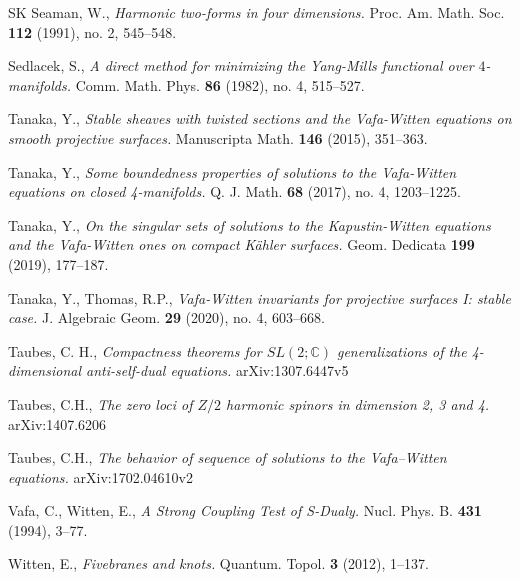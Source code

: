 \documentclass[12pt, twoside]{article}
\theoremstyle{definition}
\numberwithin{equation}{section}
\begin{document}
\begin{thebibliography}{SK}
Seaman, W.,
\textit{Harmonic two-forms in four dimensions.}
Proc. Am. Math. Soc. \textbf{112} (1991), no. 2, 545--548. 

Sedlacek, S.,
\textit{A direct method for minimizing the Yang-Mills functional over $4$-manifolds.}
 Comm. Math. Phys. \textbf{86} (1982), no. 4, 515--527. 

Tanaka, Y.,
\textit{Stable sheaves with twisted sections and the Vafa-Witten equations on smooth projective surfaces.}
{Manuscripta Math.} \textbf{146} (2015), 351--363.

Tanaka, Y.,
\textit{Some boundedness properties of solutions to the Vafa-Witten equations on closed 4-manifolds.}
Q. J. Math. \textbf{68} (2017), no. 4, 1203--1225. 

Tanaka, Y.,
\textit{On the singular sets of solutions to the Kapustin-Witten equations and the Vafa-Witten ones on compact Kähler surfaces.}
Geom. Dedicata \textbf{199} (2019), 177--187. 

Tanaka, Y., Thomas, R.P., 
\textit{Vafa-Witten invariants for projective surfaces I: stable case.}
J. Algebraic Geom. \textbf{29} (2020), no. 4, 603--668. 

Taubes, C. H.,
\textit{Compactness theorems for $SL(2;\mathbb{C})$ generalizations of the 4-dimensional anti-self-dual equations.} arXiv:1307.6447v5

Taubes, C.H.,
\textit{The zero loci of $Z/2$ harmonic spinors in dimension 2, 3 and 4.} arXiv:1407.6206

Taubes, C.H.,
\textit{The behavior of sequence of solutions to the Vafa–Witten equations.} arXiv:1702.04610v2 

Vafa, C., Witten, E.,
 \textit{A Strong Coupling Test of S-Dualy.}
{Nucl. Phys. B.} \textbf{431} (1994), 3--77.

Witten, E., \textit{Fivebranes and knots.} Quantum. Topol. \textbf{3} (2012), 1--137.

\end{thebibliography}
\end{document}

